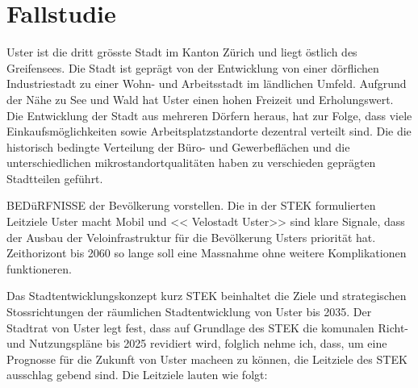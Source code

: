 %
%
%
%

\chapter{Fallstudie}
\label{chap:Fallstudie}

Uster ist die dritt grösste Stadt im Kanton Zürich und liegt östlich des Greifensees. Die Stadt ist geprägt von der Entwicklung von einer dörflichen Industriestadt zu einer Wohn- und Arbeitsstadt im ländlichen Umfeld. Aufgrund der Nähe zu See und Wald hat Uster einen hohen Freizeit und Erholungswert.
Die Entwicklung der Stadt aus mehreren Dörfern heraus, hat zur Folge, dass viele Einkaufsmöglichkeiten sowie Arbeitsplatzstandorte dezentral verteilt sind. Die die historisch bedingte Verteilung der Büro- und Gewerbeflächen und die unterschiedlichen mikrostandortqualitäten haben zu verschieden geprägten Stadtteilen geführt. 

BEDüRFNISSE der Bevölkerung vorstellen.
Die in der STEK formulierten Leitziele \guillemotleft Uster macht Mobil \guillemotright und << Velostadt Uster>> sind klare Signale, dass der Ausbau der Veloinfrastruktur für die Bevölkerung Usters priorität hat.
Zeithorizont bis 2060 so lange soll eine Massnahme ohne weitere Komplikationen funktioneren.


Das Stadtentwicklungskonzept kurz STEK beinhaltet die Ziele und strategischen Stossrichtungen der räumlichen Stadtentwicklung von Uster bis 2035. Der Stadtrat von Uster legt fest, dass auf Grundlage des STEK die komunalen Richt- und Nutzungspläne bis 2025 revidiert wird, folglich nehme ich, dass, um eine Prognosse für die Zukunft von Uster macheen zu können, die Leitziele des STEK ausschlag gebend sind. Die Leitziele lauten wie folgt: 

